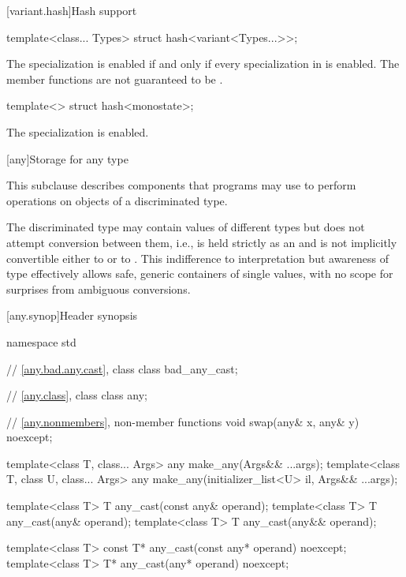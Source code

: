 [variant.hash]{Hash support}

%
\begin{itemdecl}
template<class... Types> struct hash<variant<Types...>>;
\end{itemdecl}

\begin{itemdescr}
\pnum
The specialization  is enabled
if and only if every specialization in  is enabled.
The member functions are not guaranteed to be .
\end{itemdescr}

%
\begin{itemdecl}
template<> struct hash<monostate>;
\end{itemdecl}

\begin{itemdescr}
\pnum
The specialization is enabled.
\end{itemdescr}


[any]{Storage for any type}

\pnum
This subclause describes components that \Cpp{} programs may use to perform operations on objects of a discriminated type.

\pnum
\begin{note}
The discriminated type may contain values of different types but does not attempt conversion between them,
i.e.,  is held strictly as an  and is not implicitly convertible either to  or to .
This indifference to interpretation but awareness of type effectively allows safe, generic containers of single values, with no scope for surprises from ambiguous conversions.
\end{note}

[any.synop]{Header  synopsis}

%

\begin{codeblock}
namespace std {
  // \ref{any.bad.any.cast}, class 
  class bad_any_cast;

  // \ref{any.class}, class 
  class any;

  // \ref{any.nonmembers}, non-member functions
  void swap(any& x, any& y) noexcept;

  template<class T, class... Args>
    any make_any(Args&& ...args);
  template<class T, class U, class... Args>
    any make_any(initializer_list<U> il, Args&& ...args);

  template<class T>
    T any_cast(const any& operand);
  template<class T>
    T any_cast(any& operand);
  template<class T>
    T any_cast(any&& operand);

  template<class T>
    const T* any_cast(const any* operand) noexcept;
  template<class T>
    T* any_cast(any* operand) noexcept;
}
\end{codeblock}

